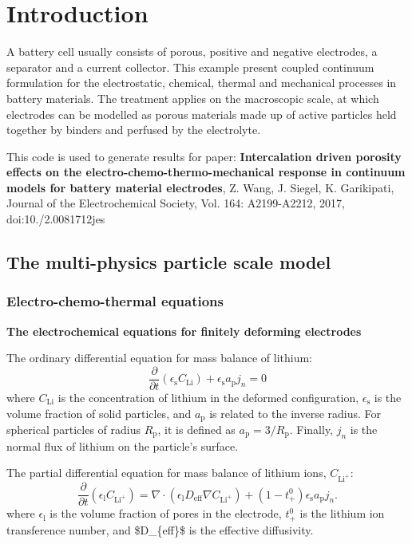 \hypertarget{growth_Introduction}{}\section{Introduction}\label{growth_Introduction}
A battery cell usually consists of porous, positive and negative electrodes, a separator and a current collector. This example present coupled continuum formulation for the electrostatic, chemical, thermal and mechanical processes in battery materials. The treatment applies on the macroscopic scale, at which electrodes can be modelled as porous materials made up of active particles held together by binders and perfused by the electrolyte.

This code is used to generate results for paper\-: {\bfseries Intercalation driven porosity effects on the electro-\/chemo-\/thermo-\/mechanical response in continuum models for battery material electrodes}, Z. Wang, J. Siegel, K. Garikipati, Journal of the Electrochemical Society, Vol. 164\-: A2199-\/\-A2212, 2017, doi\-:10./2.0081712jes  \hypertarget{battery_particle_section1}{}\subsection{The multi-\/physics particle scale model}\label{battery_particle_section1}
\hypertarget{battery_particle_subsub1}{}\subsubsection{Electro-\/chemo-\/thermal equations}\label{battery_particle_subsub1}
{\bfseries The electrochemical equations for finitely deforming electrodes}\par
 The ordinary differential equation for mass balance of lithium\-: \[ \frac{\partial}{\partial t}({\epsilon_\text{s}C_\text{Li}})+\epsilon_\text{s}{a_\text{p}}j_n=0 \] where $C_\text{Li}$ is the concentration of lithium in the deformed configuration, $\epsilon_\text{s}$ is the volume fraction of solid particles, and $a_\text{p}$ is related to the inverse radius. For spherical particles of radius $R_\text{p}$, it is defined as $a_\text{p} = 3/R_\text{p}$. Finally, $j_n$ is the normal flux of lithium on the particle's surface.

The partial differential equation for mass balance of lithium ions, $C_{\text{Li}^+}$\-: \[ \frac{\partial }{\partial t}(\epsilon_\text{l}C_{\text{Li}^+})=\nabla\cdot (\epsilon_\text{l}D_\text{eff}\nabla C_{\text{Li}^+})+(1-t^0_+)\epsilon_\text{s}{a_\text{p}}j_n. \] where $\epsilon_\text{l}$ is the volume fraction of pores in the electrode, $t^0_+$ is the lithium ion transference number, and \$\-D\-\_\-\{eff\}\$ is the effective diffusivity.

